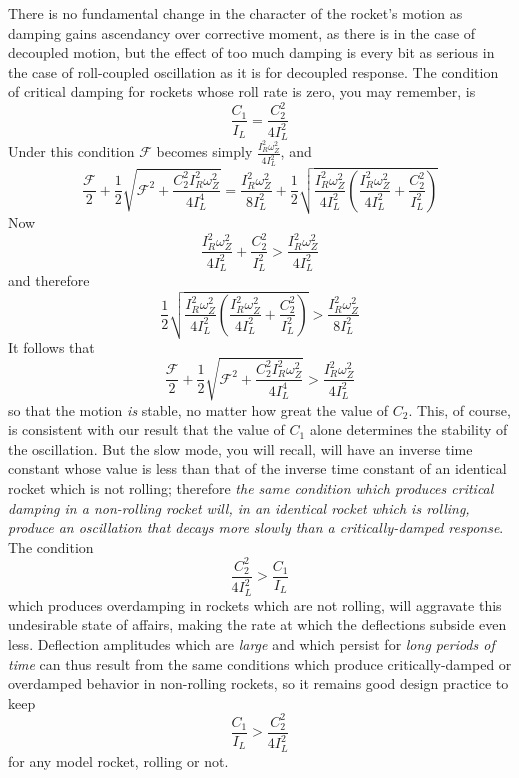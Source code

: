 There is no fundamental change in the character of the rocket's motion as
damping gains ascendancy over corrective moment, as there is in the case of
decoupled motion, but the effect of too much damping is every bit as serious
in the case of roll-coupled oscillation as it is for decoupled response. The
condition of critical damping for rockets whose roll rate is zero, you may
remember, is
\begin{equation*}
\frac{C_1}{I_L} = \frac{C_2^2}{4I_L^2}
\end{equation*}
Under this condition $\mathscr{F}$ becomes simply
$\frac{I_R^2\omega_Z^2}{4I_L^2}$, and
\begin{equation*}
\frac{\mathscr{F}}{2} + \frac{1}{2}\sqrt{\mathscr{F}^2
  + \frac{C_2^2 I_R^2\omega_Z^2}{4I_L^4}}
  = \frac{I_R^2\omega_Z^2}{8I_L^2}
  + \frac{1}{2}\sqrt{\frac{I_R^2\omega_Z^2}{4I_L^2}
    \left(\frac{I_R^2\omega_Z^2}{4I_L^2} + \frac{C_2^2}{I_L^2}\right)}
\end{equation*}
Now
\begin{equation*}
\frac{I_R^2\omega_Z^2}{4I_L^2} + \frac{C_2^2}{I_L^2}
  > \frac{I_R^2\omega_Z^2}{4I_L^2}
\end{equation*}
and therefore
\begin{equation*}
\frac{1}{2}\sqrt{\frac{I_R^2\omega_Z^2}{4I_L^2}
  \left(\frac{I_R^2\omega_Z^2}{4I_L^2} + \frac{C_2^2}{I_L^2}\right)}
  > \frac{I_R^2\omega_Z^2}{8I_L^2}
\end{equation*}
It follows that
\begin{equation*}
\frac{\mathscr{F}}{2} + \frac{1}{2}\sqrt{\mathscr{F}^2
  + \frac{C_2^2 I_R^2\omega_Z^2}{4I_L^4}} > \frac{I_R^2\omega_Z^2}{4I_L^2}
\end{equation*}
so that the motion \emph{is} stable, no matter how great the value of $C_2$.
This, of course, is consistent with our result that the value of $C_1$ alone
determines the stability of the oscillation. But the slow mode, you will
recall, will have an inverse time constant whose value is less than that of
the inverse time constant of an identical rocket which is not rolling;
therefore \emph{the same condition which produces critical damping in a
non-rolling rocket will, in an identical rocket which is rolling, produce an
oscillation that decays more slowly than a critically-damped response}. The
condition
\begin{equation*}
\frac{C_2^2}{4I_L^2} > \frac{C_1}{I_L}
\end{equation*}
which produces overdamping in rockets which are not rolling, will aggravate
this undesirable state of affairs, making the rate at which the deflections
subside even less. Deflection amplitudes which are \emph{large} and which
persist for \emph{long periods of time} can thus result from the same
conditions which produce critically-damped or overdamped behavior in
non-rolling rockets, so it remains good design practice to keep
\begin{equation*}
\frac{C_1}{I_L} > \frac{C_2^2}{4I_L^2}
\end{equation*}
for any model rocket, rolling or not.
